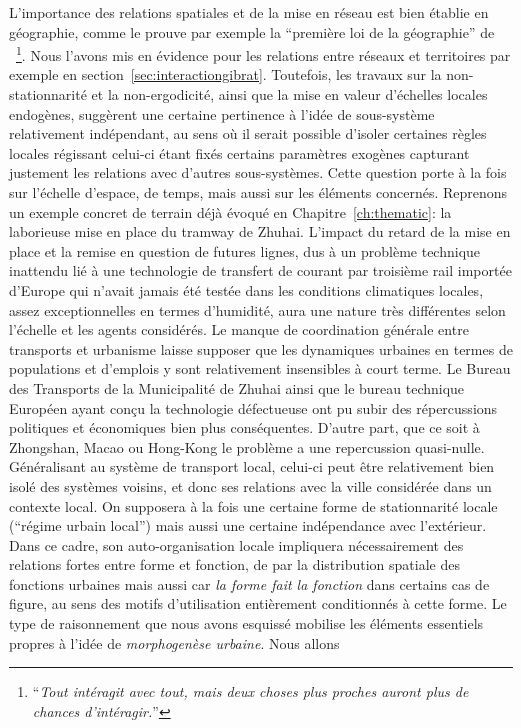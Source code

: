 L'importance des relations spatiales et de la mise en réseau est bien établie en géographie, comme le prouve par exemple la ``première loi de la géographie'' de ~\cite{tobler2004first}\footnote{``\textit{Tout intéragit avec tout, mais deux choses plus proches auront plus de chances d'intéragir.}''}. Nous l'avons mis en évidence pour les relations entre réseaux et territoires par exemple en section~\ref{sec:interactiongibrat}. Toutefois, les travaux sur la non-stationnarité et la non-ergodicité, ainsi que la mise en valeur d'échelles locales endogènes, suggèrent une certaine pertinence à l'idée de sous-système relativement indépendant, au sens où il serait possible d'isoler certaines règles locales régissant celui-ci étant fixés certains paramètres exogènes capturant justement les relations avec d'autres sous-systèmes. Cette question porte à la fois sur l'échelle d'espace, de temps, mais aussi sur les éléments concernés. Reprenons un exemple concret de terrain déjà évoqué en Chapitre~\ref{ch:thematic}: la laborieuse mise en place du tramway de Zhuhai. L'impact du retard de la mise en place et la remise en question de futures lignes, dus à un problème technique inattendu lié à une technologie de transfert de courant par troisième rail importée d'Europe qui n'avait jamais été testée dans les conditions climatiques locales, assez exceptionnelles en termes d'humidité, aura une nature très différentes selon l'échelle et les agents considérés. Le manque de coordination générale entre transports et urbanisme laisse supposer que les dynamiques urbaines en termes de populations et d'emplois y sont relativement insensibles à court terme. Le Bureau des Transports de la Municipalité de Zhuhai ainsi que le bureau technique Européen ayant conçu la technologie défectueuse ont pu subir des répercussions politiques et économiques bien plus conséquentes. D'autre part, que ce soit à Zhongshan, Macao ou Hong-Kong le problème a une repercussion quasi-nulle. Généralisant au système de transport local, celui-ci peut être relativement bien isolé des systèmes voisins, et donc ses relations avec la ville considérée dans un contexte local. On supposera à la fois une certaine forme de stationnarité locale (``régime urbain local'') mais aussi une certaine indépendance avec l'extérieur. Dans ce cadre, son auto-organisation locale impliquera nécessairement des relations fortes entre forme et fonction, de par la distribution spatiale des fonctions urbaines mais aussi car \emph{la forme fait la fonction} dans certains cas de figure, au sens des motifs d'utilisation entièrement conditionnés à cette forme. Le type de raisonnement que nous avons esquissé mobilise les éléments essentiels propres à l'idée de \emph{morphogenèse urbaine}. Nous allons 